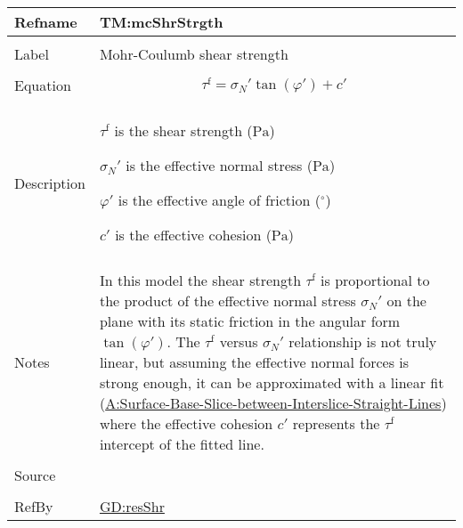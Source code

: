 \documentclass[12pt]{article}
\begin{document}
\vspace{\baselineskip}
\noindent
\begin{minipage}{\textwidth}
\begin{tabular}{>{\raggedright}p{}>{\raggedright\arraybackslash}p{}}
\toprule \textbf{Refname} & \textbf{TM:mcShrStrgth}
\label{TM:mcShrStrgth}
\\ \midrule \\
Label & Mohr-Coulumb shear strength
        
\\ \midrule \\
Equation & \begin{displaymath}
           {τ^{\text{f}}}={σ_{N}}' \tan\left(φ'\right)+c'
           \end{displaymath}
\\ \midrule \\
Description & \begin{symbDescription}
              \item{${τ^{\text{f}}}$ is the shear strength (${\text{Pa}}$)}
              \item{${σ_{N}}'$ is the effective normal stress (${\text{Pa}}$)}
              \item{$φ'$ is the effective angle of friction (${{}^{\circ}}$)}
              \item{$c'$ is the effective cohesion (${\text{Pa}}$)}
              \end{symbDescription}
\\ \midrule \\
Notes & In this model the shear strength ${τ^{\text{f}}}$ is proportional to the product of the effective normal stress ${σ_{N}}'$ on the plane with its static friction in the angular form $\tan\left(φ'\right)$. The ${τ^{\text{f}}}$ versus ${σ_{N}}'$ relationship is not truly linear, but assuming the effective normal forces is strong enough, it can be approximated with a linear fit (\hyperref[assumpSBSBISL]{A:Surface-Base-Slice-between-Interslice-Straight-Lines}) where the effective cohesion $c'$ represents the ${τ^{\text{f}}}$ intercept of the fitted line.
        
\\ \midrule \\
Source & \cite{fredlund1977}
         
\\ \midrule \\
RefBy & \hyperref[GD:resShr]{GD:resShr}
        
\\ \bottomrule
\end{tabular}
\end{minipage}
\end{document}
